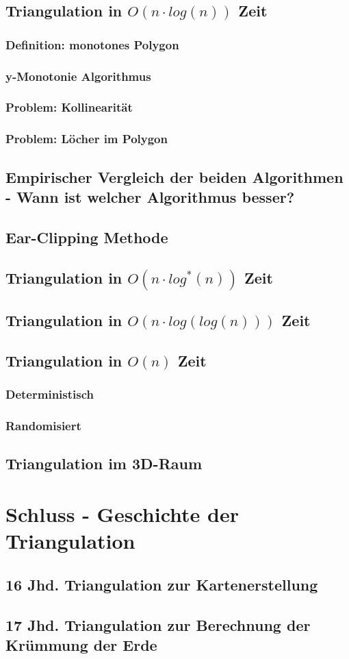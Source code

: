 \documentclass[a4paper]{article}
\begin{document}
\subsection{Triangulation in $O(n\cdot log(n))$ Zeit}
\subsubsection{Definition: monotones Polygon}
\subsubsection{y-Monotonie Algorithmus}
\subsubsection{Problem: Kollinearität}
\subsubsection{Problem: Löcher im Polygon}

\subsection{Empirischer Vergleich der beiden Algorithmen - Wann ist welcher Algorithmus besser?}
\subsection{Ear-Clipping Methode}
\subsection{Triangulation in $O(n\cdot log^*(n))$ Zeit}
\subsection{Triangulation in $O(n\cdot log(log(n)))$ Zeit}
\subsection{Triangulation in $O(n)$ Zeit}
\subsubsection{Deterministisch}
\subsubsection{Randomisiert}
\subsection{Triangulation im 3D-Raum}




\section{Schluss - Geschichte der Triangulation}
\subsection{16 Jhd. Triangulation zur Kartenerstellung}
\subsection{17 Jhd. Triangulation zur Berechnung der Krümmung der Erde}
\end{document}
